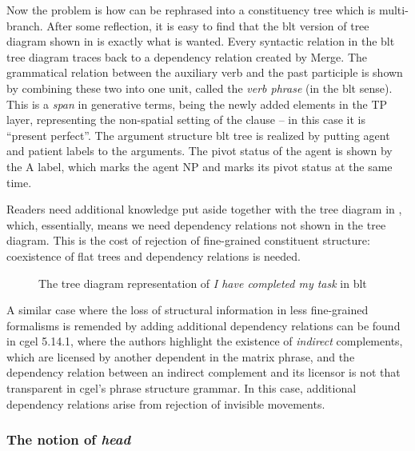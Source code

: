 \documentclass[../main.tex]{subfiles}
\begin{document}
Now the problem is how can  be rephrased into a constituency tree 
which is multi-branch. After some reflection, it is easy to find that 
the \ac{blt} version of tree diagram shown in  is exactly what is wanted.
Every syntactic relation in the \ac{blt} tree diagram 
traces back to a dependency relation created by Merge. 
The grammatical relation between the auxiliary verb and the past participle is shown 
by combining these two into one unit, called the \emph{verb phrase} (in the \ac{blt} sense).
This is a \emph{span} in generative terms, being the newly added elements in the TP layer,
representing the non-spatial setting of the clause -- in this case it is ``present perfect''.
The argument structure \ac{blt} tree is realized by putting agent and patient labels to the arguments.
The pivot status of the agent is shown by the A label, 
which marks the agent NP and marks its pivot status at the same time.

Readers need additional knowledge put aside together with 
the tree diagram in , which, essentially, 
means we need dependency relations not shown in the tree diagram.
This is the cost of rejection of fine-grained constituent structure: 
coexistence of flat trees and dependency relations is needed.

\begin{figure}
    \centering
    
    \caption{The tree diagram representation of \emph{I have completed my task} in \ac{blt}}
    \label{fig:complete-my-task-blt-1}
\end{figure}

A similar case where the loss of structural information in less fine-grained formalisms
is remended by adding additional dependency relations can be found in \ac{cgel} 5.14.1, 
where the authors highlight the existence of \emph{indirect} complements, 
which are licensed by another dependent in the matrix phrase, 
and the dependency relation between an indirect complement and its licensor is not that 
transparent in \ac{cgel}'s phrase structure grammar.
In this case, additional dependency relations arise from rejection of invisible movements.

\subsubsection{The notion of \emph{head}}\label{sec:headedness}
\end{document}
